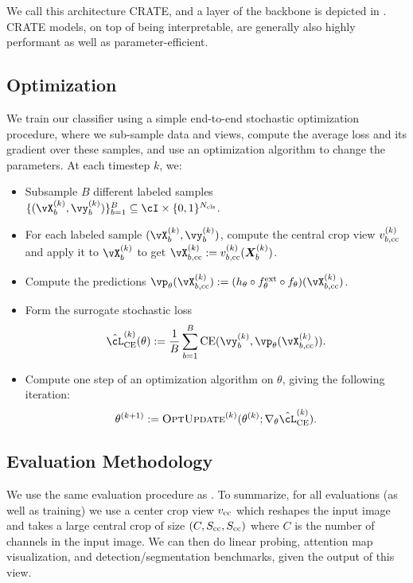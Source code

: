 \documentclass[\toplevelprefix/book-main.tex]{subfiles}
\begin{document}
We call this architecture CRATE, and a layer of the backbone is depicted in . CRATE models, on top of being interpretable, are generally also highly performant as well as parameter-efficient. 

\subsection{Optimization} \label{sub:image_classification_optimization}

We train our classifier using a simple end-to-end stochastic optimization procedure, where we sub-sample data and views, compute the average loss and its gradient over these samples, and use an optimization algorithm to change the parameters. At each timestep \(k\), we:
\begin{itemize}
    \item Subsample \(B\) different labeled samples \(\{(\vX_{b}^{(k)}, \vy_{b}^{(k)})\}_{b = 1}^{B} \subseteq \cI \times \{0, 1\}^{N_{\cls}}\).
    \item For each labeled sample \((\vX_{b}^{(k)}, \vy_{b}^{(k)})\), compute the central crop view \(v_{b, \mathrm{cc}}^{(k)}\) and apply it to \(\vX_{b}^{(k)}\) to get \(\vX_{b, \cc}^{(k)} := v_{b, \cc}^{(k)}(\X_{b}^{(k)})\).
    \item Compute the predictions \(\vp_{\theta}(\vX_{b, \cc}^{(k)}) := (h_{\theta} \circ f_{\theta}^{\ext} \circ f_{\theta})(\vX_{b, \cc}^{(k)})\).
    \item Form the surrogate stochastic loss 
    \begin{equation}
        \hat{\cL}_{\CE}^{(k)}(\theta) := \frac{1}{B}\sum_{b = 1}^{B}\CE(\vy_{b}^{(k)}, \vp_{\theta}(\vX_{b, \cc}^{(k)})).
    \end{equation}
    \item Compute one step of an optimization algorithm on \(\theta\), giving the following iteration:
    \begin{equation}
        \theta^{(k + 1)} := \textsc{OptUpdate}^{(k)}(\theta^{(k)}; \nabla_{\theta}\hat{\cL}_{\CE}^{(k)}).
    \end{equation}
\end{itemize}


\subsection{Evaluation Methodology} \label{sub:image_classification_evals}

We use the same evaluation procedure as . To summarize, for all evaluations (as well as training) we use a center crop view \(v_{\mathrm{cc}}\) which reshapes the input image and takes a large central crop of size \((C, S_{\mathrm{cc}}, S_{\mathrm{cc}})\) where \(C\) is the number of channels in the input image. We can then do linear probing, attention map visualization, and detection/segmentation benchmarks, given the output of this view.
\end{document}
